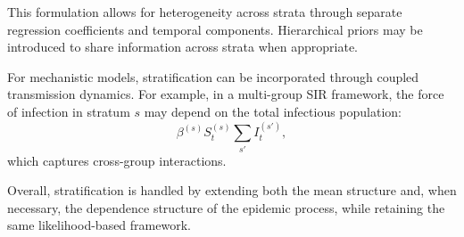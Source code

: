 \documentclass[12pt]{article}
\begin{document}
This formulation allows for heterogeneity across strata through separate regression coefficients and temporal components. Hierarchical priors may be introduced to share information across strata when appropriate.

For mechanistic models, stratification can be incorporated through coupled transmission dynamics. For example, in a multi-group SIR framework, the force of infection in stratum $s$ may depend on the total infectious population:
\begin{equation}
    \beta^{(s)} S_t^{(s)} \sum_{s'} I_t^{(s')},
\end{equation}
which captures cross-group interactions.

Overall, stratification is handled by extending both the mean structure and, when necessary, the dependence structure of the epidemic process, while retaining the same likelihood-based framework.
\end{document}
